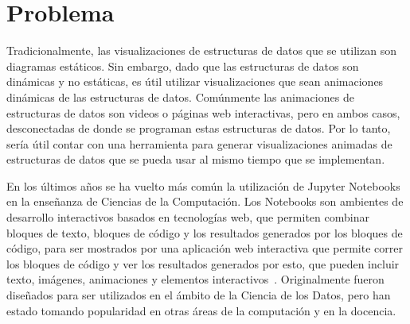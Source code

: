 \chapter{Problema}





Tradicionalmente, las visualizaciones de estructuras de datos que se utilizan son diagramas estáticos. Sin embargo, dado que las estructuras de datos son dinámicas y no estáticas, es útil utilizar visualizaciones que sean animaciones dinámicas de las estructuras de datos. Comúnmente las animaciones de estructuras de datos son videos o páginas web interactivas, pero en ambos casos, desconectadas de donde se programan estas estructuras de datos. Por lo tanto, sería útil contar con una herramienta para generar visualizaciones animadas de estructuras de datos que se pueda usar al mismo tiempo que se implementan.

En los últimos años se ha vuelto más común la utilización de Jupyter Notebooks en la enseñanza de Ciencias de la Computación. Los Notebooks son ambientes de desarrollo interactivos basados en tecnologías web, que permiten combinar bloques de texto, bloques de código y los resultados generados por los bloques de código, para ser mostrados por una aplicación web interactiva que permite correr los bloques de código y ver los resultados generados por esto, que pueden incluir texto, imágenes, animaciones y elementos interactivos~\cite{kluyver2016jupyter}. Originalmente fueron diseñados para ser utilizados en el ámbito de la Ciencia de los Datos, pero han estado tomando popularidad en otras áreas de la computación y en la docencia.

